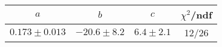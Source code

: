 \begin{tabular}{c|c|c|c}
$a$ & $b$ & $c$ & $\chi^2$/ndf \\
\hline
$0.173\pm0.013$ & $-20.6\pm8.2$ & $6.4\pm2.1$ & 12/26
\end{tabular}
